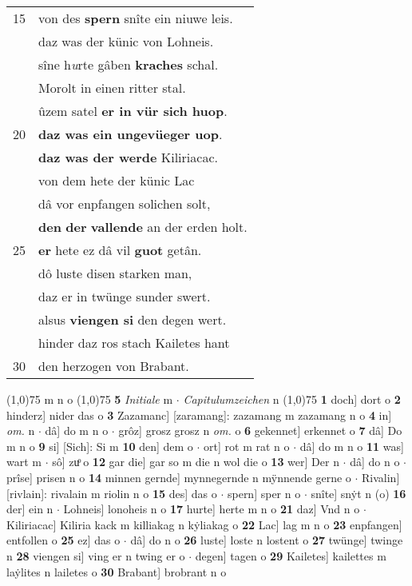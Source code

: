 \documentclass[8pt,a4paper,notitlepage]{article}
\begin{document}
\begin{table}[ht]
\begin{minipage}[t]{0.5\linewidth}
\begin{tabular}{rl}
15 & von des \textbf{spern} snîte ein niuwe leis.\\ 
 & daz was der künic von Lohneis.\\ 
 & sîne h\textit{u}rte gâben \textbf{kraches} schal.\\ 
 & Morolt in einen ritter stal.\\ 
 & ûzem satel \textbf{er in vür sich huop}.\\ 
20 & \textbf{daz was ein ungevüeger uop}.\\ 
 & \textbf{daz was der werde} Kiliriacac.\\ 
 & von dem hete der künic Lac\\ 
 & dâ vor enpfangen solichen solt,\\ 
 & \textbf{den} \textbf{der} \textbf{vallende} an der erden holt.\\ 
25 & \textbf{er} hete ez dâ vil \textbf{guot} getân.\\ 
 & dô luste disen starken man,\\ 
 & daz er in twünge sunder swert.\\ 
 & alsus \textbf{viengen si} den degen wert.\\ 
 & hinder daz ros stach Kailetes hant\\ 
30 & den herzogen von Brabant.\\ 
\end{tabular}
\scriptsize
\line(1,0){75} \newline
m n o \newline
\line(1,0){75} \newline
\textbf{5} \textit{Initiale} m   $\cdot$ \textit{Capitulumzeichen} n  \newline
\line(1,0){75} \newline
\textbf{1} doch] dort o \textbf{2} hinderz] nider das o \textbf{3} Zazamanc] [zaramang]: zazamang m zazamang n o \textbf{4} in] \textit{om.} n  $\cdot$ dâ] do m n o  $\cdot$ grôz] grosz grosz n \textit{om.} o \textbf{6} gekennet] erkennet o \textbf{7} dâ] Do m n o \textbf{9} si] [Sich]: Si m \textbf{10} den] dem o  $\cdot$ ort] rot m rat n o  $\cdot$ dâ] do m n o \textbf{11} was] wart m  $\cdot$ sô] zuͦ o \textbf{12} gar die] gar so m die n wol die o \textbf{13} wer] Der n  $\cdot$ dâ] do n o  $\cdot$ prîse] prisen n o \textbf{14} minnen gernde] mynnegernde n mÿnnende gerne o  $\cdot$ Rivalin] [rivlain]: rivalain m riolin n o \textbf{15} des] das o  $\cdot$ spern] sper n o  $\cdot$ snîte] snẏt n (o) \textbf{16} der] ein n  $\cdot$ Lohneis] lonoheis n o \textbf{17} hurte] herte m n o \textbf{21} daz] Vnd n o  $\cdot$ Kiliriacac] Kiliria kack m killiakag n kẏliakag o \textbf{22} Lac] lag m n o \textbf{23} enpfangen] entfollen o \textbf{25} ez] das o  $\cdot$ dâ] do n o \textbf{26} luste] loste n lostent o \textbf{27} twünge] twinge n \textbf{28} viengen si] ving er n twing er o  $\cdot$ degen] tagen o \textbf{29} Kailetes] kailettes m laẏlites n lailetes o \textbf{30} Brabant] brobrant n o \newline
\end{minipage}
\end{table}
\end{document}
